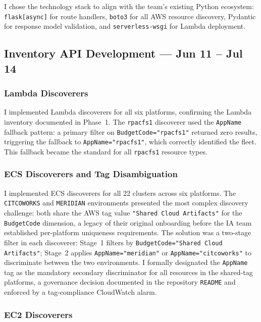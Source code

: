 I chose the technology stack to align with the team's existing Python
ecosystem: \texttt{flask[async]} for route handlers,
\texttt{boto3} for all AWS resource discovery, Pydantic for response model
validation, and \texttt{serverless-wsgi} for Lambda deployment.

\subsection{Inventory API Development --- Jun 11 -- Jul 14}

\subsubsection{Lambda Discoverers}

I implemented Lambda discoverers for all six platforms, confirming the
Lambda inventory documented in Phase~1. The \texttt{rpacfs1} discoverer
used the \texttt{AppName} fallback pattern: a primary filter on
\texttt{BudgetCode="rpacfs1"} returned zero results, triggering the fallback
to \texttt{AppName="rpacfs1"}, which correctly identified the fleet. This
fallback became the standard for all \texttt{rpacfs1} resource types.

\subsubsection{ECS Discoverers and Tag Disambiguation}

I implemented ECS discoverers for all 22 clusters across six platforms.
The \texttt{CITCOWORKS} and \texttt{MERIDIAN} environments presented the most
complex discovery challenge: both share the AWS tag value
\texttt{"Shared Cloud Artifacts"} for the \texttt{BudgetCode} dimension, a
legacy of their original onboarding before the IA team established per-platform
uniqueness requirements. The solution was a two-stage filter in each discoverer:
Stage~1 filters by \texttt{BudgetCode="Shared Cloud Artifacts"}; Stage~2
applies \texttt{AppName="meridian"} or \texttt{AppName="citcoworks"} to
discriminate between the two environments. I formally designated the \texttt{AppName} tag
as the mandatory secondary discriminator for all resources
in the shared-tag platforms, a governance decision documented in
the repository \texttt{README} and enforced by a tag-compliance CloudWatch alarm.

\subsubsection{EC2 Discoverers}

